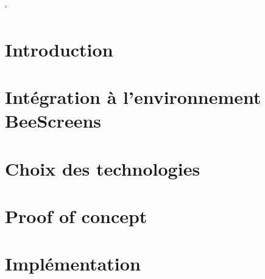 \documentclass[
    iict, %
    il, %
]{heig-tb}
\begin{document}
\maketitle
\frontmatter
\clearemptydoublepage

\lstMakeShortInline`

\preamble
\authentification

\clearemptydoublepage
\inclusvite

\begin{abstract}
  
\end{abstract}

\clearemptydoublepage
{
  \tableofcontents
  \let\cleardoublepage\clearpage
  \listoffigures
  \let\cleardoublepage\clearpage
  \listoftables
  \let\cleardoublepage\clearpage
  \listoflistings
}

\printnomenclature
\clearemptydoublepage
{}

\mainmatter
\chapter{Introduction}


\chapter{Intégration à l'environnement BeeScreens}


\chapter{Choix des technologies}


% 

\chapter{Proof of concept}
\label{poc}


\chapter{Implémentation}
\label{implementation}

\end{document}
